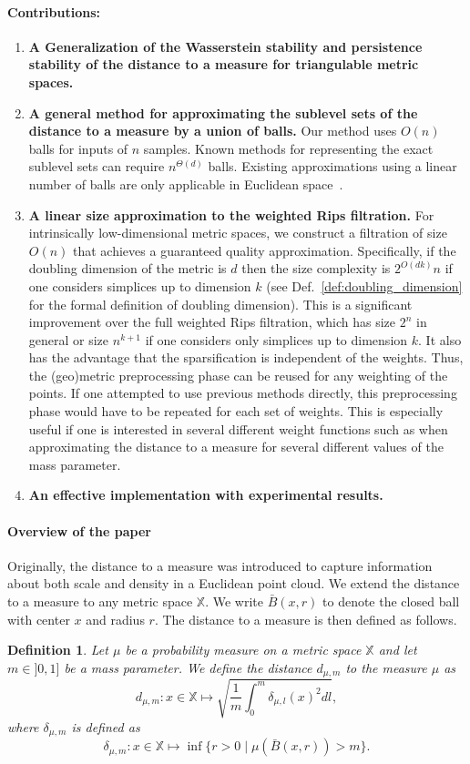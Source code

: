 \documentclass[a4paper]{article}
\newcommand\dm{d_{\mu,m}}
\newcommand\X{\mathbb{X}}
\newtheorem{definition}[theorem]{Definition}
\begin{document}
\paragraph{Contributions:}
\begin{enumerate}
  \item \textbf{A Generalization of the Wasserstein stability and persistence stability of the distance to a measure for triangulable metric spaces.}
  \item \textbf{A general method for approximating the sublevel sets of the distance to a measure by a union of balls.}  
  Our method uses $O(n)$ balls for inputs of $n$ samples.  
  Known methods for representing the exact sublevel sets can require $n^{\Theta(d)}$ balls. 
  Existing approximations using a linear number of balls are only applicable in Euclidean space~\cite{wkdGMM}.
\item \textbf{A linear size approximation to the weighted Rips filtration.}
  For intrinsically low-dimensional metric spaces, we construct a filtration of size $O(n)$ that achieves a guaranteed quality approximation.  
  Specifically, if the doubling dimension of the metric is $d$ then the size complexity is $2^{O(dk)}n$ if one considers simplices up to dimension $k$ (see Def.~\ref{def:doubling_dimension} for the formal definition of doubling dimension).
  This is a significant improvement over the full weighted Rips filtration, which has size $2^n$ in general or size $n^{k+1}$ if one considers only simplices up to dimension $k$.
  It also has the advantage that the sparsification is independent of the weights.
  Thus, the (geo)metric preprocessing phase can be reused for any weighting of the points.
  If one attempted to use previous methods directly, this preprocessing phase would have to be repeated for each set of weights.
  This is especially useful if one is interested in several different weight functions such as when approximating the distance to a measure for several different values of the mass parameter.
  \item \textbf{An effective implementation with experimental results.} 
\end{enumerate}




\paragraph{Overview of the paper} 

Originally, the distance to a measure was introduced to capture information about both scale and density in a Euclidean point cloud.
We extend the distance to a measure to any metric space $\X$.
We write $\bar{B}(x,r)$ to denote the closed ball with center $x$ and radius $r$.
The distance to a measure is then defined as follows.
\begin{definition}
Let $\mu$ be a probability measure on a metric space $\X$ and let $m\in]0,1]$ be a mass parameter. We define the distance $\dm$ to the measure $\mu$ as
\[
  \dm:x\in\X\mapsto\sqrt{\frac{1}{m}\int_0^m\delta_{\mu,l}(x)^2 dl},
\]
where $\delta_{\mu,m}$ is defined as
\[
  \delta_{\mu,m}:x\in \X \mapsto \inf\{r>0\mid\mu(\bar{B}(x,r))>m\}.
\]
\end{definition}
\end{document}

